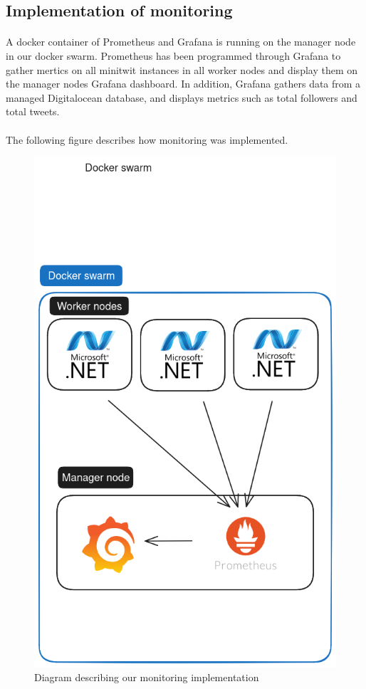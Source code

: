 \subsection{Implementation of monitoring} 
\paragraph{} A docker container of Prometheus and Grafana is running on the manager node in our docker swarm. Prometheus has been programmed through Grafana to gather mertics on all minitwit instances in all worker nodes and display them on the manager nodes Grafana dashboard. In addition, Grafana gathers data from a managed Digitalocean database, and displays metrics such as total followers and total tweets.
\paragraph{} The following figure describes how monitoring was implemented.
\begin{figure}[H]
	\centering
	\includegraphics[width=1\textwidth]{Monitoring2.png}
	\caption{Diagram describing our monitoring implementation}
	\label{fig:Monitoring2}
\end{figure}

